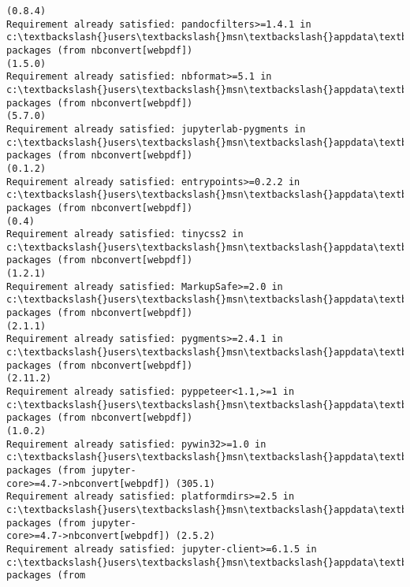 \documentclass[11pt]{article}
\begin{document}
\begin{Verbatim}[commandchars=\\\{\}]
(0.8.4)
Requirement already satisfied: pandocfilters>=1.4.1 in
c:\textbackslash{}users\textbackslash{}msn\textbackslash{}appdata\textbackslash{}local\textbackslash{}anaconda3\textbackslash{}lib\textbackslash{}site-packages (from nbconvert[webpdf])
(1.5.0)
Requirement already satisfied: nbformat>=5.1 in
c:\textbackslash{}users\textbackslash{}msn\textbackslash{}appdata\textbackslash{}local\textbackslash{}anaconda3\textbackslash{}lib\textbackslash{}site-packages (from nbconvert[webpdf])
(5.7.0)
Requirement already satisfied: jupyterlab-pygments in
c:\textbackslash{}users\textbackslash{}msn\textbackslash{}appdata\textbackslash{}local\textbackslash{}anaconda3\textbackslash{}lib\textbackslash{}site-packages (from nbconvert[webpdf])
(0.1.2)
Requirement already satisfied: entrypoints>=0.2.2 in
c:\textbackslash{}users\textbackslash{}msn\textbackslash{}appdata\textbackslash{}local\textbackslash{}anaconda3\textbackslash{}lib\textbackslash{}site-packages (from nbconvert[webpdf])
(0.4)
Requirement already satisfied: tinycss2 in
c:\textbackslash{}users\textbackslash{}msn\textbackslash{}appdata\textbackslash{}local\textbackslash{}anaconda3\textbackslash{}lib\textbackslash{}site-packages (from nbconvert[webpdf])
(1.2.1)
Requirement already satisfied: MarkupSafe>=2.0 in
c:\textbackslash{}users\textbackslash{}msn\textbackslash{}appdata\textbackslash{}local\textbackslash{}anaconda3\textbackslash{}lib\textbackslash{}site-packages (from nbconvert[webpdf])
(2.1.1)
Requirement already satisfied: pygments>=2.4.1 in
c:\textbackslash{}users\textbackslash{}msn\textbackslash{}appdata\textbackslash{}local\textbackslash{}anaconda3\textbackslash{}lib\textbackslash{}site-packages (from nbconvert[webpdf])
(2.11.2)
Requirement already satisfied: pyppeteer<1.1,>=1 in
c:\textbackslash{}users\textbackslash{}msn\textbackslash{}appdata\textbackslash{}local\textbackslash{}anaconda3\textbackslash{}lib\textbackslash{}site-packages (from nbconvert[webpdf])
(1.0.2)
Requirement already satisfied: pywin32>=1.0 in
c:\textbackslash{}users\textbackslash{}msn\textbackslash{}appdata\textbackslash{}local\textbackslash{}anaconda3\textbackslash{}lib\textbackslash{}site-packages (from jupyter-
core>=4.7->nbconvert[webpdf]) (305.1)
Requirement already satisfied: platformdirs>=2.5 in
c:\textbackslash{}users\textbackslash{}msn\textbackslash{}appdata\textbackslash{}local\textbackslash{}anaconda3\textbackslash{}lib\textbackslash{}site-packages (from jupyter-
core>=4.7->nbconvert[webpdf]) (2.5.2)
Requirement already satisfied: jupyter-client>=6.1.5 in
c:\textbackslash{}users\textbackslash{}msn\textbackslash{}appdata\textbackslash{}local\textbackslash{}anaconda3\textbackslash{}lib\textbackslash{}site-packages (from

\end{Verbatim}
\end{document}
